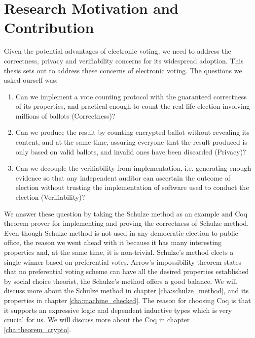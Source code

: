 \section{Research Motivation and Contribution}
Given the potential advantages of electronic voting,  we need to address
the correctness, privacy and verifiability concerns for its widespread adoption. 
This thesis sets out to address these concerns of electronic voting. 
The questions we asked ourself was:
 \begin{enumerate} 
  \item Can we implement a vote counting protocol with the  
    guaranteed correctness of its properties, and practical enough
    to count the real life election involving millions of ballots (Correctness)?
  \item Can we produce the result by counting encrypted ballot without revealing 
  its content, and at the same time, 
  assuring everyone that the result produced is only based on valid ballots, 
  and invalid ones have been discarded  (Privacy)?
 \item Can we decouple the verifiability from implementation, i.e. 
    generating enough evidence so that any independent auditor can 
    ascertain the outcome of election without trusting the implementation 
    of software used to conduct the election (Verifiability)?
  \end{enumerate}

\noindent
We answer these question by taking the Schulze method \citep{Schulze:2011:NMC} 
as an example and Coq \citep{Bertot:2004:ITP}
theorem prover  for implementing and proving the correctness of  Schulze method.
Even though Schulze method is not used in any democratic election to public office, the reason 
 we went ahead with it because it has many interesting properties and, 
 at the same time, it is non-trivial.   Schulze's method elects  a single winner based on 
preferential votes.  Arrow's impossibility theorem \citep{Arrow:1950:DCS} states
 that no preferential voting 
scheme can have all the desired properties established by  social choice theorist,
the Schulze's method offers a good balance. We will discuss more about the Schulze method in 
chapter \ref{cha:schulze_method}, and its properties in chapter \ref{cha:machine_checked}. 
The reason for choosing Coq is that it supports an expressive logic and dependent 
inductive types which is very crucial for us. We will discuss more about the Coq in 
chapter \ref{cha:theorem_crypto}.

